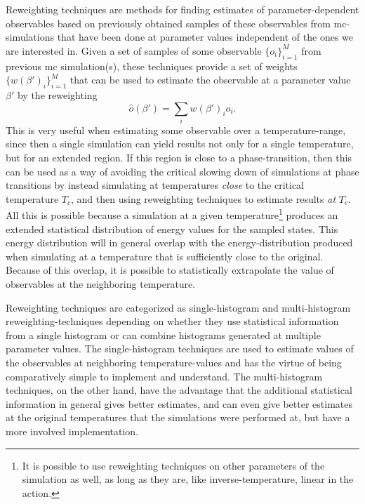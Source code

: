 Reweighting techniques are methods for finding estimates of parameter-dependent observables based on previously obtained
samples of these observables from \ac{mc}-simulations that have been done at parameter values independent of the ones we are interested in.
Given a set of samples of some observable $\{o_i\}_{i=1}^M$ from previous \ac{mc} simulation(s), these techniques provide
a set of weights $\{w(\beta')_i\}_{i=1}^M$ that can be used to estimate the observable at a parameter value $\beta'$ by the reweighting
\begin{equation}
    \label{eq:Monte:Reweighting:generalReweighting}
    \hat{o}(\beta') = \sum_iw(\beta')_io_i.
\end{equation}
This is very useful when estimating some observable over a temperature-range, since then a single simulation can yield results
not only for a single temperature, but for an extended region. If this region is close to a phase-transition, then this can be used as a way of avoiding the
critical slowing down of simulations at phase transitions by instead simulating at temperatures \emph{close} to the critical temperature $T_c$, and then using reweighting
techniques to estimate results \emph{at} $T_c$. All this is possible because a simulation at a given temperature\footnote{It is possible
to use reweighting techniques on other parameters of the simulation as well, as long as they are, like inverse-temperature, linear in the action.}
produces an extended statistical distribution of energy values for the sampled states. This energy distribution will in general overlap with the energy-distribution
produced when simulating at a temperature that is sufficiently close to the original. Because of this overlap, it is possible to statistically extrapolate
the value of observables at the neighboring temperature.

Reweighting techniques are categorized as single-histogram and multi-histogram reweighting-techniques depending on whether they use statistical information
from a single histogram or can combine histograms generated at multiple parameter values. The single-histogram techniques are used to estimate values of the observables
at neighboring temperature-values and has the virtue of being comparatively simple to implement and understand. The multi-histogram
techniques, on the other hand, have the advantage that the additional statistical information in general gives better estimates, and can even give better estimates
at the original temperatures that the simulations were performed at, but have a more involved implementation.

